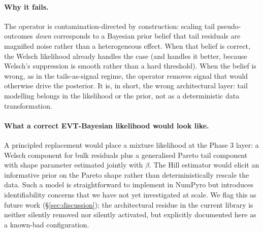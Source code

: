 \paragraph{Why it fails.}
The operator is contamination-directed by construction: scaling
tail pseudo-outcomes \emph{down} corresponds to a Bayesian prior
belief that tail residuals are magnified noise rather than a
heterogeneous effect. When that belief is correct, the Welsch
likelihood already handles the case (and handles it better,
because Welsch's suppression is smooth rather than a hard
threshold). When the belief is wrong, as in the tails-as-signal
regime, the operator removes signal that would otherwise drive
the posterior. It is, in short, the wrong architectural layer:
tail modelling belongs in the likelihood or the prior, not as a
deterministic data transformation.

\paragraph{What a correct EVT-Bayesian likelihood would look like.}
A principled replacement would place a mixture likelihood at the
Phase 3 layer: a Welsch component for bulk residuals plus a
generalised Pareto tail component with shape parameter estimated
jointly with $\beta$. The Hill estimator would elicit an
informative prior on the Pareto shape rather than deterministically
rescale the data. Such a model is straightforward to implement in
NumPyro but introduces identifiability concerns that we have not
yet investigated at scale. We flag this as future work
(\S\ref{sec:discussion}); the architectural residue in the
current library is neither silently removed nor silently
activated, but explicitly documented here as a known-bad
configuration.
